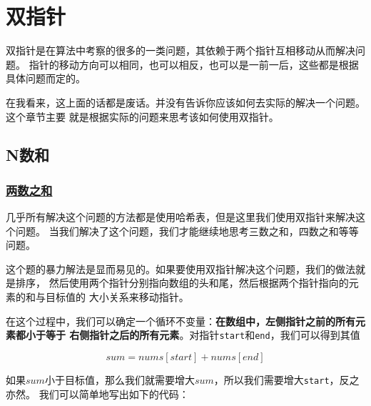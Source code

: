 \documentclass[../../main.tex]{subfiles}
\begin{document}
\chapter{双指针}

双指针是在算法中考察的很多的一类问题，其依赖于两个指针互相移动从而解决问题。
指针的移动方向可以相同，也可以相反，也可以是一前一后，这些都是根据具体问题而定的。

在我看来，这上面的话都是废话。并没有告诉你应该如何去实际的解决一个问题。这个章节主要
就是根据实际的问题来思考该如何使用双指针。

\section{N数和}

\subsection{\href{https://leetcode-cn.com/problems/two-sum/}{两数之和}}

几乎所有解决这个问题的方法都是使用哈希表，但是这里我们使用双指针来解决这个问题。
当我们解决了这个问题，我们才能继续地思考三数之和，四数之和等等问题。

这个题的暴力解法是显而易见的。如果要使用双指针解决这个问题，我们的做法就是排序，
然后使用两个指针分别指向数组的头和尾，然后根据两个指针指向的元素的和与目标值的
大小关系来移动指针。

在这个过程中，我们可以确定一个循环不变量：\textbf{在数组中，左侧指针之前的所有元素都小于等于
右侧指针之后的所有元素}。对指针\verb|start|和\verb|end|，我们可以得到其值

$$
sum = nums[start] + nums[end]
$$

如果$sum$小于目标值，那么我们就需要增大$sum$，所以我们需要增大\verb|start|，反之亦然。
我们可以简单地写出如下的代码：


\end{document}
